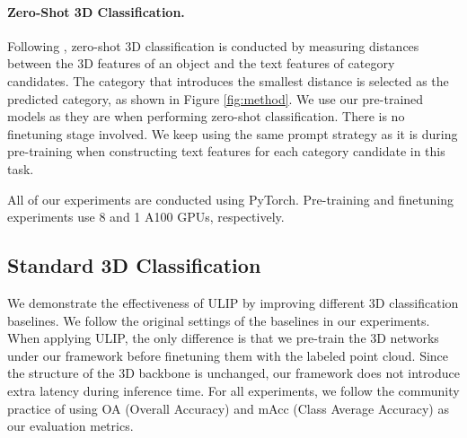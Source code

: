 \vspace{-10pt}
\paragraph{Zero-Shot 3D Classification.} Following \cite{zhang2022pointclip}, zero-shot 3D classification is conducted by measuring distances between the 3D features of an object and the text features of category candidates. The category that introduces the smallest distance is selected as the predicted category, as shown in Figure \ref{fig:method}. We use our pre-trained models as they are when performing zero-shot classification. There is no finetuning stage involved. We keep using the same prompt strategy as it is during pre-training when constructing text features for each category candidate in this task.

All of our experiments are conducted using PyTorch. Pre-training and finetuning experiments use 8 and 1 A100 GPUs, respectively.

\subsection{Standard 3D Classification}
We demonstrate the effectiveness of ULIP by improving different 3D classification baselines. We follow the original settings of the baselines in our experiments. When applying ULIP, the only difference is that we pre-train the 3D networks under our framework before finetuning them with the labeled point cloud. Since the structure of the 3D backbone is unchanged, our framework does not introduce extra latency during inference time.
For all experiments, we follow the community practice of using OA (Overall Accuracy) and mAcc (Class Average Accuracy) as our evaluation metrics.

